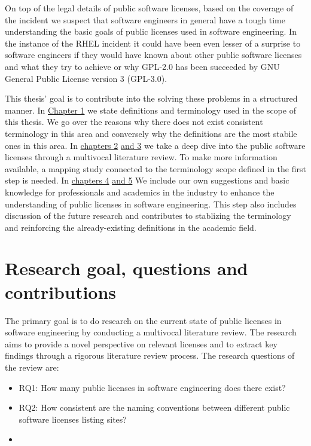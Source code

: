 On top of the legal details of public software licenses, based on the coverage of the incident we suspect that software engineers in general have a tough time understanding the basic goals of public licenses used in software engineering. In the instance of the RHEL incident it could have been even lesser of a surprise to software engineers if they would have known about other public software licenses and what they try to achieve or why GPL-2.0 has been succeeded by GNU General Public License version 3 (GPL-3.0).

This thesis' goal is to contribute into the solving these problems in a structured manner. In \hyperref[intro]{Chapter 1}  we state definitions and terminology used in the scope of this thesis. We go over the reasons why there does not exist consistent terminology in this area and conversely why the definitions are the most stabile ones in this area. In \hyperref[methods]{chapters 2} \hyperref[results]{and 3} we take a deep dive into the public software licenses through a multivocal literature review. To make more information available, a mapping study connected to the terminology scope defined in the first step is needed. In \hyperref[discussion]{chapters 4} \hyperref[conclusions]{and 5} We include our own suggestions and basic knowledge for professionals and academics in the industry to enhance the understanding of public licenses in software engineering. This step also includes discussion of the future research and contributes to stablizing the terminology and reinforcing the already-existing definitions in the academic field.

\section{Research goal, questions and contributions}
The primary goal is to do research on the current state of public licenses in software engineering by conducting a multivocal literature review. The research aims to provide a novel perspective on relevant licenses and to extract key findings through a rigorous literature review process. The research questions of the review are:
\begin{itemize}
  \item RQ1: How many public licenses in software engineering does there exist?
  \item RQ2: How consistent are the naming conventions between different public software licenses listing sites?
  \item 
\end{itemize}

